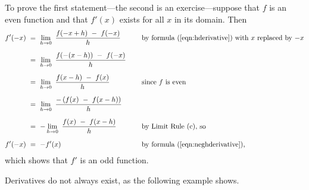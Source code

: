 To prove the first statement---the second is an exercise---suppose that $f$ is
an even function and that $f'(x)$ exists for all $x$ in its domain. Then
\begin{alignat*}{3}
 f'(-x) ~&=~ \lim_{h \to 0} ~\frac{f(-x + h) ~-~ f(-x)}{h} \qquad&&\text{by
  formula (\ref{eqn:hderivative}) with $x$ replaced by $-x$}\\[6pt]
 &=~ \lim_{h \to 0} ~\frac{f(-(x - h)) ~-~ f(-x)}{h} &&{}\\[6pt]
 &=~ \lim_{h \to 0} ~\frac{f(x - h) ~-~ f(x)}{h}
  &&\text{since $f$ is even}\\[6pt]
 &=~ \lim_{h \to 0} ~\frac{-\left(f(x) ~-~ f(x-h)\right)}{h} &&{}\\[6pt]
 &=~ -\lim_{h \to 0} ~\frac{f(x) ~-~ f(x-h)}{h}
  &&\text{by Limit Rule (c), so}\\[6pt]
 f'(-x) ~&=~ -f'(x) &&\text{by formula (\ref{eqn:neghderivative}),}
\end{alignat*}
which shows that $f'$ is an odd function.

Derivatives do not always exist, as the following example shows.


